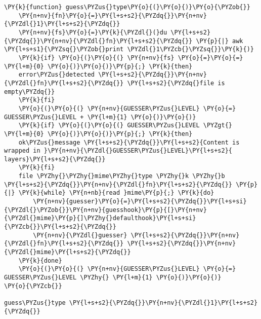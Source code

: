 \begin{Verbatim}[commandchars=\\\{\}]
\PY{k}{function} guess\PYZus{}type\PY{o}{(}\PY{o}{)}\PY{o}{\PYZob{}}
    \PY{n+nv}{fn}\PY{o}{=}\PY{l+s+s2}{\PYZdq{}}\PY{n+nv}{\PYZdl{}1}\PY{l+s+s2}{\PYZdq{}}
    \PY{n+nv}{fs}\PY{o}{=}\PY{k}{\PYZdl{}(}du \PY{l+s+s2}{\PYZdq{}}\PY{n+nv}{\PYZdl{}fn}\PY{l+s+s2}{\PYZdq{}} \PY{p}{|} awk \PY{l+s+s1}{\PYZsq{}\PYZob{}print \PYZdl{}1\PYZcb{}\PYZsq{}}\PY{k}{)}
    \PY{k}{if} \PY{o}{(}\PY{o}{(} \PY{n+nv}{fs} \PY{o}{=}\PY{o}{=} \PY{l+m}{0} \PY{o}{)}\PY{o}{)}\PY{p}{;} \PY{k}{then}
	error\PYZus{}detected \PY{l+s+s2}{\PYZdq{}}\PY{n+nv}{\PYZdl{}fn}\PY{l+s+s2}{\PYZdq{}} \PY{l+s+s2}{\PYZdq{}file is empty\PYZdq{}}
    \PY{k}{fi}
    \PY{o}{(}\PY{o}{(} \PY{n+nv}{GUESSER\PYZus{}LEVEL} \PY{o}{=} GUESSER\PYZus{}LEVEL + \PY{l+m}{1} \PY{o}{)}\PY{o}{)}
    \PY{k}{if} \PY{o}{(}\PY{o}{(} GUESSER\PYZus{}LEVEL \PYZgt{} \PY{l+m}{0} \PY{o}{)}\PY{o}{)}\PY{p}{;} \PY{k}{then}
	ok\PYZus{}message \PY{l+s+s2}{\PYZdq{}}\PY{l+s+s2}{Content is wrapped in }\PY{n+nv}{\PYZdl{}GUESSER\PYZus{}LEVEL}\PY{l+s+s2}{ layers}\PY{l+s+s2}{\PYZdq{}}
    \PY{k}{fi}
    file \PYZhy{}\PYZhy{}mime\PYZhy{}type \PYZhy{}k \PYZhy{}b \PY{l+s+s2}{\PYZdq{}}\PY{n+nv}{\PYZdl{}fn}\PY{l+s+s2}{\PYZdq{}} \PY{p}{|} \PY{k}{while} \PY{n+nb}{read }mime\PY{p}{;} \PY{k}{do}
		\PY{n+nv}{guesser}\PY{o}{=}\PY{l+s+s2}{\PYZdq{}}\PY{l+s+si}{\PYZdl{}\PYZob{}}\PY{n+nv}{guesshook}\PY{p}{[}\PY{n+nv}{\PYZdl{}mime}\PY{p}{]\PYZhy{}defaulthook}\PY{l+s+si}{\PYZcb{}}\PY{l+s+s2}{\PYZdq{}}
		\PY{n+nv}{\PYZdl{}guesser} \PY{l+s+s2}{\PYZdq{}}\PY{n+nv}{\PYZdl{}fn}\PY{l+s+s2}{\PYZdq{}} \PY{l+s+s2}{\PYZdq{}}\PY{n+nv}{\PYZdl{}mime}\PY{l+s+s2}{\PYZdq{}}
    \PY{k}{done}
    \PY{o}{(}\PY{o}{(} \PY{n+nv}{GUESSER\PYZus{}LEVEL} \PY{o}{=} GUESSER\PYZus{}LEVEL \PYZhy{} \PY{l+m}{1} \PY{o}{)}\PY{o}{)}
\PY{o}{\PYZcb{}}

guess\PYZus{}type \PY{l+s+s2}{\PYZdq{}}\PY{n+nv}{\PYZdl{}1}\PY{l+s+s2}{\PYZdq{}}
\end{Verbatim}

